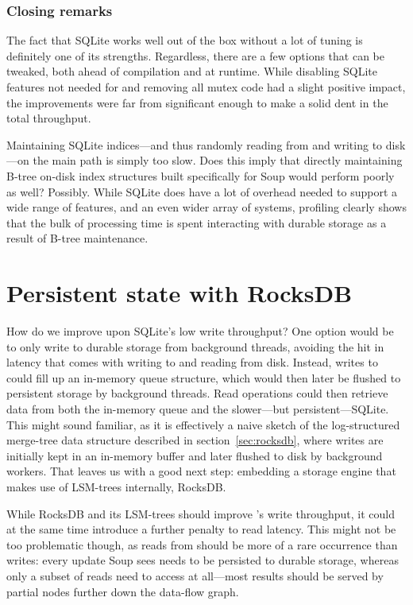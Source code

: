 
\subsubsection{Closing remarks}

The fact that SQLite works well out of the box without a lot of tuning is
definitely one of its strengths. Regardless, there are a few options that can be
tweaked, both ahead of compilation and at runtime. While disabling SQLite
features not needed for  and removing all mutex code had a
slight positive impact, the improvements were far from significant enough to
make a solid dent in the total throughput.

Maintaining SQLite indices---and thus randomly reading from and writing to
disk---on the main path is simply too slow. Does this imply that directly
maintaining B-tree on-disk index structures built specifically for Soup would
perform poorly as well? Possibly. While SQLite does have a lot of overhead
needed to support a wide range of features, and an even wider array of systems,
profiling clearly shows that the bulk of processing time is spent interacting
with durable storage as a result of B-tree maintenance.

\section{Persistent state with RocksDB}

How do we improve upon SQLite's low write throughput? One option would be to
only write to durable storage from background threads, avoiding the hit in
latency that comes with writing to and reading from disk. Instead, writes to
 could fill up an in-memory queue structure, which would
then later be flushed to persistent storage by background threads. Read
operations could then retrieve data from both the in-memory queue and the
slower---but persistent---SQLite. This might sound familiar, as it is
effectively a naive sketch of the log-structured merge-tree data structure
described in section~\ref{sec:rocksdb}, where writes are initially kept in an
in-memory buffer and later flushed to disk by background workers. That leaves us
with a good next step: embedding a storage engine that makes use of LSM-trees
internally, RocksDB.\@

While RocksDB and its LSM-trees should improve 's write
throughput, it could at the same time introduce a further penalty to read
latency. This might not be too problematic though, as reads from
 should be more of a rare occurrence than writes: every
update Soup sees needs to be persisted to durable storage, whereas only a subset
of reads need to access  at all---most results should be
served by partial nodes further down the data-flow graph.

